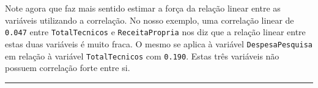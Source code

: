 \documentclass[12pt,]{style/krantz}
\theoremstyle{definition}
\theoremstyle{definition}
\theoremstyle{definition}
\theoremstyle{remark}
\begin{document}
Note agora que faz mais sentido estimar a força da relação linear entre
as variáveis utilizando a correlação. No nosso exemplo, uma correlação
linear de \texttt{0.047} entre \texttt{TotalTecnicos} e
\texttt{ReceitaPropria} nos diz que a relação linear entre estas duas
variáveis é muito fraca. O mesmo se aplica à variável
\texttt{DespesaPesquisa} em relação à variável \texttt{TotalTecnicos}
com \texttt{0.190}. Estas três variáveis não possuem correlação forte
entre si.

\begin{center}\rule{0.5\linewidth}{\linethickness}\end{center}

\cleardoublepage 

\appendix {}




\backmatter
\printindex
\end{document}
